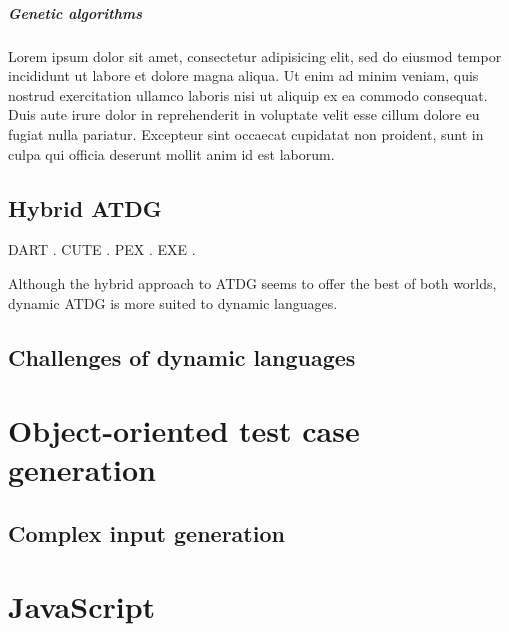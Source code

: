 \documentclass[a4paper,11pt,titlepage]{report}
\begin{document}
\subparagraph{Genetic algorithms} Lorem ipsum dolor sit amet, consectetur adipisicing elit, sed do eiusmod tempor incididunt ut labore et dolore magna aliqua. Ut enim ad minim veniam, quis nostrud exercitation ullamco laboris nisi ut aliquip ex ea commodo consequat. Duis aute irure dolor in reprehenderit in voluptate velit esse cillum dolore eu fugiat nulla pariatur. Excepteur sint occaecat cupidatat non proident, sunt in culpa qui officia deserunt mollit anim id est laborum.






\subsection{Hybrid ATDG}
DART \cite{godefroid2005dart}. CUTE \cite{sen2005cute}. PEX \cite{tillmann2008pex}. EXE \cite{cadar2008exe}.

Although the hybrid approach to ATDG seems to offer the best of both worlds, dynamic ATDG is more suited to dynamic languages.

\subsection{Challenges of dynamic languages}

\section{Object-oriented test case generation}
\subsection{Complex input generation} 

\section{JavaScript}
\end{document}
